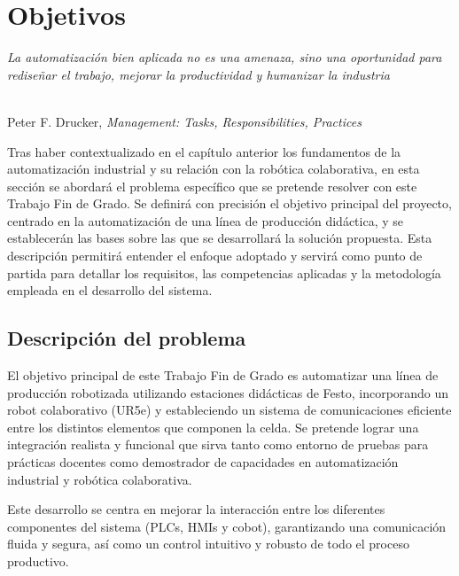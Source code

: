\chapter{Objetivos}
\label{cap:capitulo2}

\begin{flushright}
\begin{minipage}[]{10cm}
\emph{La automatización bien aplicada no es una amenaza, sino una oportunidad para rediseñar el trabajo, mejorar la productividad y humanizar la industria}\\
\end{minipage}\\

Peter F. Drucker, \textit{ Management: Tasks, Responsibilities, Practices}\\
\end{flushright}

\vspace{1cm}

Tras haber contextualizado en el capítulo anterior los fundamentos de la automatización industrial y su relación con la robótica colaborativa, en esta sección se abordará el problema específico que se pretende resolver con este Trabajo Fin de Grado. Se definirá con precisión el objetivo principal del proyecto, centrado en la automatización de una línea de producción didáctica, y se establecerán las bases sobre las que se desarrollará la solución propuesta. Esta descripción permitirá entender el enfoque adoptado y servirá como punto de partida para detallar los requisitos, las competencias aplicadas y la metodología empleada en el desarrollo del sistema.

\section{Descripción del problema}
\label{sec:descripcion}

El objetivo principal de este Trabajo Fin de Grado es automatizar una línea de producción robotizada utilizando estaciones didácticas de Festo, incorporando un robot colaborativo (UR5e) y estableciendo un sistema de comunicaciones eficiente entre los distintos elementos que componen la celda. Se pretende lograr una integración realista y funcional que sirva tanto como entorno de pruebas para prácticas docentes como demostrador de capacidades en automatización industrial y robótica colaborativa.

Este desarrollo se centra en mejorar la interacción entre los diferentes componentes del sistema (PLCs, HMIs y cobot), garantizando una comunicación fluida y segura, así como un control intuitivo y robusto de todo el proceso productivo.

